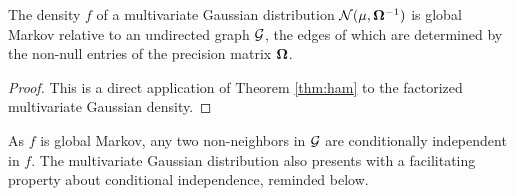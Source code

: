  \begin{prop}\label{pp:glob}
The density $f$ of a multivariate Gaussian distribution $\mathcal{N}(\mu, {\boldsymbol{\Omega}}^{-1})$ is global Markov relative to an undirected graph $\mathcal{G}$, the edges of which are determined by the non-null entries of the precision matrix ${\boldsymbol{\Omega}}$.
 \end{prop}
 \begin{proof}
 This is a direct application of Theorem \ref{thm:ham} to the factorized multivariate Gaussian density.
\end{proof} 

As $f$ is global Markov, any two non-neighbors in $\mathcal{G}$ are conditionally independent in $f$.  The multivariate Gaussian distribution also presents with a facilitating property about conditional independence, reminded below.
 
